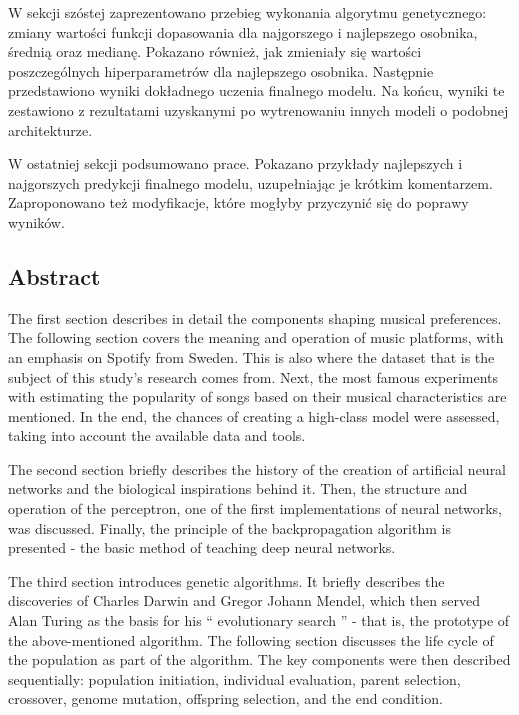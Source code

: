 \documentclass[a4paper,12pt]{article}
\numberwithin{figure}{section}
\begin{document}
    \bigskip

    W sekcji szóstej zaprezentowano przebieg wykonania algorytmu genetycznego: zmiany wartości funkcji dopasowania dla najgorszego i najlepszego osobnika, średnią oraz medianę. Pokazano również, jak zmieniały się wartości poszczególnych hiperparametrów dla najlepszego osobnika. Następnie przedstawiono wyniki dokładnego uczenia finalnego modelu. Na końcu, wyniki te zestawiono z rezultatami uzyskanymi po wytrenowaniu innych modeli o podobnej architekturze.

    \bigskip

    W ostatniej sekcji podsumowano prace. Pokazano przykłady najlepszych i najgorszych predykcji finalnego modelu, uzupełniając je krótkim komentarzem. Zaproponowano też modyfikacje, które mogłyby przyczynić się do poprawy wyników.

    \subsection{Abstract}

    The first section describes in detail the components shaping musical preferences. The following section covers the meaning and operation of music platforms, with an emphasis on Spotify from Sweden. This is also where the dataset that is the subject of this study's research comes from. Next, the most famous experiments with estimating the popularity of songs based on their musical characteristics are mentioned. In the end, the chances of creating a high-class model were assessed, taking into account the available data and tools.

    \bigskip

    The second section briefly describes the history of the creation of artificial neural networks and the biological inspirations behind it. Then, the structure and operation of the perceptron, one of the first implementations of neural networks, was discussed. Finally, the principle of the backpropagation algorithm is presented - the basic method of teaching deep neural networks.

    \bigskip

    The third section introduces genetic algorithms. It briefly describes the discoveries of Charles Darwin and Gregor Johann Mendel, which then served Alan Turing as the basis for his `` evolutionary search '' - that is, the prototype of the above-mentioned algorithm. The following section discusses the life cycle of the population as part of the algorithm. The key components were then described sequentially: population initiation, individual evaluation, parent selection, crossover, genome mutation, offspring selection, and the end condition.
\end{document}
